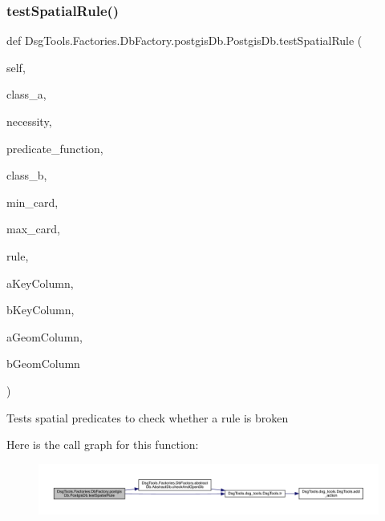 \subsubsection{\texorpdfstring{test\+Spatial\+Rule()}{testSpatialRule()}}
{\footnotesize\ttfamily def Dsg\+Tools.\+Factories.\+Db\+Factory.\+postgis\+Db.\+Postgis\+Db.\+test\+Spatial\+Rule (\begin{DoxyParamCaption}\item[{}]{self,  }\item[{}]{class\+\_\+a,  }\item[{}]{necessity,  }\item[{}]{predicate\+\_\+function,  }\item[{}]{class\+\_\+b,  }\item[{}]{min\+\_\+card,  }\item[{}]{max\+\_\+card,  }\item[{}]{rule,  }\item[{}]{a\+Key\+Column,  }\item[{}]{b\+Key\+Column,  }\item[{}]{a\+Geom\+Column,  }\item[{}]{b\+Geom\+Column }\end{DoxyParamCaption})}

\begin{DoxyVerb}Tests spatial predicates to check whether a rule is broken
\end{DoxyVerb}
 Here is the call graph for this function\+:
\nopagebreak
\begin{figure}[H]
\begin{center}
\leavevmode
\includegraphics[width=350pt]{class_dsg_tools_1_1_factories_1_1_db_factory_1_1postgis_db_1_1_postgis_db_abeada3e87837c4fc934994476ff189fb_cgraph}
\end{center}
\end{figure}
\mbox{\label{class_dsg_tools_1_1_factories_1_1_db_factory_1_1postgis_db_1_1_postgis_db_a76ef724edcd5902e8ebf520d2e77170f}} 
